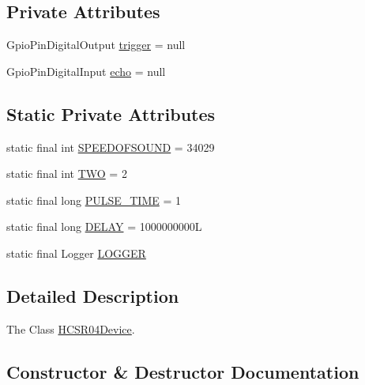 \subsection*{Private Attributes}
\begin{DoxyCompactItemize}
\item 
Gpio\+Pin\+Digital\+Output \hyperlink{classcom_1_1libsensorj_1_1concretesensor_1_1HCSR04Device_ac898198f98143f7a1a4f281ea3c7c607}{trigger} = null
\item 
Gpio\+Pin\+Digital\+Input \hyperlink{classcom_1_1libsensorj_1_1concretesensor_1_1HCSR04Device_adf8ec00f094aefba690583e5a349c99d}{echo} = null
\end{DoxyCompactItemize}
\subsection*{Static Private Attributes}
\begin{DoxyCompactItemize}
\item 
static final int \hyperlink{classcom_1_1libsensorj_1_1concretesensor_1_1HCSR04Device_a1468a6c38c0086477a54eddbfe288299}{S\+P\+E\+E\+D\+O\+F\+S\+O\+U\+N\+D} = 34029
\item 
static final int \hyperlink{classcom_1_1libsensorj_1_1concretesensor_1_1HCSR04Device_a8f69accf3efa61a642b5e8693f7f158a}{T\+W\+O} = 2
\item 
static final long \hyperlink{classcom_1_1libsensorj_1_1concretesensor_1_1HCSR04Device_aaa527e39259b9e1be1b6360a397b3d30}{P\+U\+L\+S\+E\+\_\+\+T\+I\+M\+E} = 1
\item 
static final long \hyperlink{classcom_1_1libsensorj_1_1concretesensor_1_1HCSR04Device_a70071e4956bf93391031789b18039b6c}{D\+E\+L\+A\+Y} = 1000000000\+L
\item 
static final Logger \hyperlink{classcom_1_1libsensorj_1_1concretesensor_1_1HCSR04Device_a53449c0a7229928ddbb88c0d586cc63d}{L\+O\+G\+G\+E\+R}
\end{DoxyCompactItemize}


\subsection{Detailed Description}
The Class \hyperlink{classcom_1_1libsensorj_1_1concretesensor_1_1HCSR04Device}{H\+C\+S\+R04\+Device}. 

\subsection{Constructor \& Destructor Documentation}
\hypertarget{classcom_1_1libsensorj_1_1concretesensor_1_1HCSR04Device_ae0c7cdd02e374f360dff8d06a59b7c6d}{}

